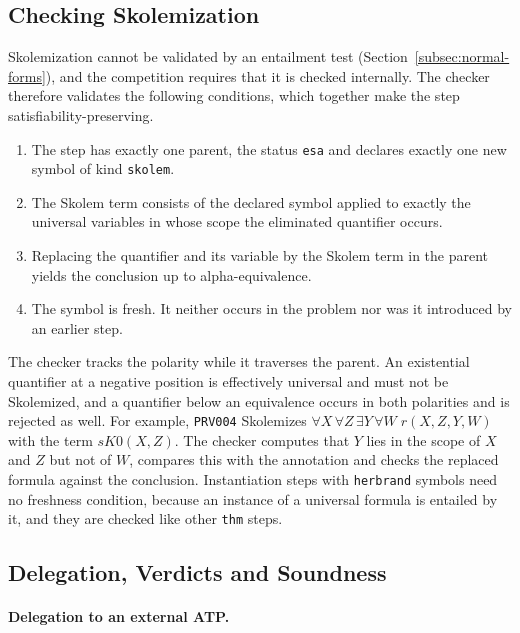 \subsection{Checking Skolemization}
\label{subsec:design-skolem}

Skolemization cannot be validated by an entailment test (Section~\ref{subsec:normal-forms}), and the competition requires that it is checked internally. The checker therefore validates the following conditions, which together make the step satisfiability-preserving.
\begin{enumerate}
  \item The step has exactly one parent, the status \texttt{esa} and declares exactly one new symbol of kind \texttt{skolem}.
  \item The Skolem term consists of the declared symbol applied to exactly the universal variables in whose scope the eliminated quantifier occurs.
  \item Replacing the quantifier and its variable by the Skolem term in the parent yields the conclusion up to alpha-equivalence.
  \item The symbol is fresh. It neither occurs in the problem nor was it introduced by an earlier step.
\end{enumerate}
The checker tracks the polarity while it traverses the parent.
An existential quantifier at a negative position is effectively universal and must not be Skolemized, and a quantifier below an equivalence occurs in both polarities and is rejected as well.
For example, \texttt{PRV004} Skolemizes $\forall X\,\forall Z\,\exists Y\,\forall W\; r(X,Z,Y,W)$ with the term $\mathit{sK0}(X,Z)$. The checker computes that $Y$ lies in the scope of $X$ and $Z$ but not of $W$, compares this with the annotation and checks the replaced formula against the conclusion.
Instantiation steps with \texttt{herbrand} symbols need no freshness condition, because an instance of a universal formula is entailed by it, and they are checked like other \texttt{thm} steps.

\subsection{Delegation, Verdicts and Soundness}
\label{subsec:design-atp}

\paragraph{Delegation to an external ATP.}

